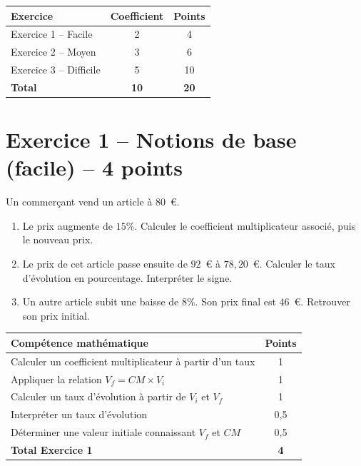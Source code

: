 \documentclass[12pt,a4paper]{article}
\begin{document}
\begin{center}
\renewcommand{\arraystretch}{1.5}
\begin{tabular}{lcc}
\hline
\textbf{Exercice} & \textbf{Coefficient} & \textbf{Points} \\
\hline
Exercice 1 -- Facile & 2 & 4 \\
\hline
Exercice 2 -- Moyen & 3 & 6 \\
\hline
Exercice 3 -- Difficile & 5 & 10 \\
\hline
\textbf{Total} & \textbf{10} & \textbf{20} \\
\hline
\end{tabular}
\end{center}

\section*{Exercice 1 -- Notions de base (facile) -- 4 points}

Un commerçant vend un article à \(80\)~\euro{}.

\begin{enumerate}[label=\textbf{\arabic*.}]
    \item Le prix augmente de \(15\%\). Calculer le coefficient multiplicateur associé, puis le nouveau prix.
    \item Le prix de cet article passe ensuite de \(92\)~\euro{} à \(78{,}20\)~\euro{}. Calculer le taux d'évolution en pourcentage. Interpréter le signe.
    \item Un autre article subit une baisse de \(8\%\). Son prix final est \(46\)~\euro{}. Retrouver son prix initial.
\end{enumerate}

\begin{center}
\renewcommand{\arraystretch}{1.5}
\begin{tabular}{>{\raggedright\arraybackslash}p{10.5cm} c}
\hline
\textbf{Compétence mathématique} & \textbf{Points} \\
\hline
Calculer un coefficient multiplicateur à partir d'un taux & 1 \\
\hline
Appliquer la relation \(V_f = CM \times V_i\) & 1 \\
\hline
Calculer un taux d'évolution à partir de \(V_i\) et \(V_f\) & 1 \\
\hline
Interpréter un taux d'évolution & 0{,}5 \\
\hline
Déterminer une valeur initiale connaissant \(V_f\) et \(CM\) & 0{,}5 \\
\hline
\textbf{Total Exercice 1} & \textbf{4} \\
\hline
\end{tabular}
\end{center}
\end{document}
